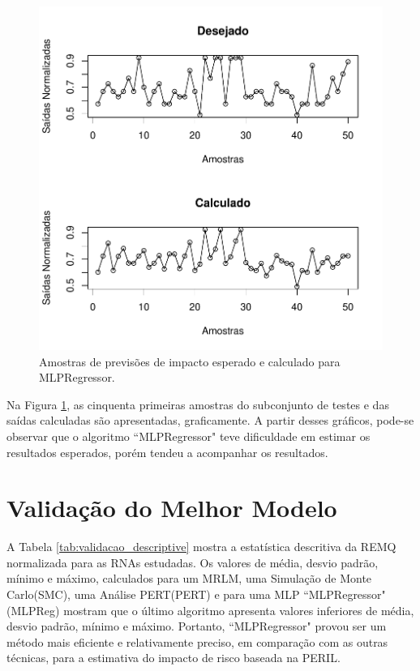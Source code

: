\begin{figure}[!h]
  \vspace{-0.2cm}
  \centering
  \includegraphics[width=0.7\columnwidth]{image/mlpreg_ex4_2.pdf}
  \caption{Amostras de previsões de impacto esperado e calculado para MLPRegressor.}
  \label{fig:anns_result_8}
\end{figure}

Na Figura \ref{fig:anns_result_8}, as cinquenta primeiras amostras do subconjunto de testes e das saídas calculadas são apresentadas, graficamente. A partir desses gráficos, pode-se observar que o algoritmo ``MLPRegressor" teve dificuldade em estimar os resultados esperados, porém tendeu a acompanhar os resultados.

\section{Validação do Melhor Modelo}

A Tabela \ref{tab:validacao_descriptive} mostra a estatística descritiva da REMQ normalizada para as RNAs estudadas. Os valores de média, desvio padrão, mínimo e máximo, calculados para um MRLM, uma Simulação de Monte Carlo(SMC), uma Análise PERT(PERT) e para uma MLP ``MLPRegressor"(MLPReg) mostram que o último algoritmo apresenta valores inferiores de média, desvio padrão, mínimo e máximo. Portanto, ``MLPRegressor" provou ser um método mais eficiente e relativamente preciso, em comparação com as outras técnicas, para a estimativa do impacto de risco baseada na PERIL.

